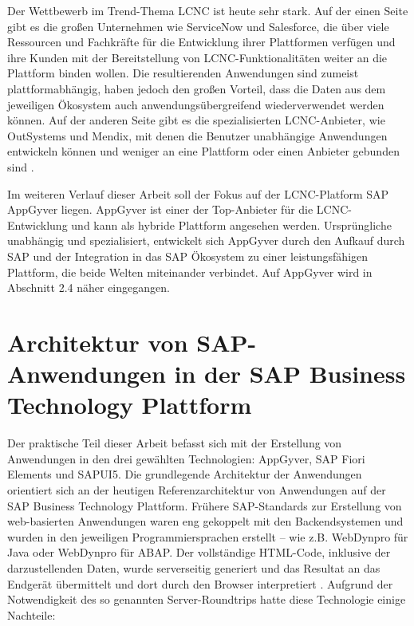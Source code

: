 Der Wettbewerb im Trend-Thema LCNC ist heute sehr stark. Auf der einen Seite gibt es die großen Unternehmen wie ServiceNow und Salesforce, die über viele Ressourcen und Fachkräfte für die Entwicklung ihrer Plattformen verfügen und ihre Kunden mit der Bereitstellung von LCNC-Funktionalitäten weiter an die Plattform binden wollen. Die resultierenden Anwendungen sind zumeist plattformabhängig, haben jedoch den großen Vorteil, dass die Daten aus dem jeweiligen Ökosystem auch anwendungsübergreifend wiederverwendet werden können. Auf der anderen Seite gibt es die spezialisierten LCNC-Anbieter, wie OutSystems und Mendix, mit denen die Benutzer unabhängige Anwendungen entwickeln können und weniger an eine Plattform oder einen Anbieter gebunden sind \cite{lcnc:snflc}.

Im weiteren Verlauf dieser Arbeit soll der Fokus auf der LCNC-Platform SAP AppGyver liegen. AppGyver ist einer der Top-Anbieter für die LCNC-Entwicklung und kann als hybride Plattform angesehen werden. Ursprüngliche unabhängig und spezialisiert, entwickelt sich AppGyver durch den Aufkauf durch SAP und der Integration in das SAP Ökosystem zu einer leistungsfähigen Plattform, die beide Welten miteinander verbindet. Auf AppGyver wird in Abschnitt 2.4 näher eingegangen.

\section{Architektur von SAP-Anwendungen in der SAP Business Technology Plattform}

Der praktische Teil dieser Arbeit befasst sich mit der Erstellung von Anwendungen in den drei gewählten Technologien: AppGyver, SAP Fiori Elements und SAPUI5. Die grundlegende Architektur der Anwendungen orientiert sich an der heutigen Referenzarchitektur von Anwendungen auf der SAP Business Technology Plattform.
Frühere SAP-Standards zur Erstellung von web-basierten Anwendungen waren eng gekoppelt mit den Backendsystemen und wurden in den jeweiligen Programmiersprachen erstellt – wie z.B. WebDynpro für Java oder WebDynpro für ABAP. Der vollständige HTML-Code, inklusive der darzustellenden Daten, wurde serverseitig generiert und das Resultat an das Endgerät übermittelt und dort durch den Browser interpretiert \cite[S.46]{fiori}. Aufgrund der Notwendigkeit des so genannten Server-Roundtrips hatte diese Technologie einige Nachteile:
 
